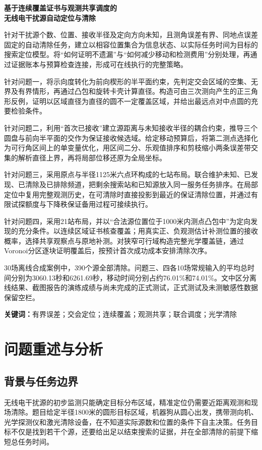 \documentclass[UTF8,a4paper,12pt,fontset=fandol]{ctexart}
\newcommand{\nextpage}{\clearpage}
\begin{document}
\begin{center}
{\heiti\bfseries 基于连续覆盖证书与观测共享调度的\\无线电干扰源自动定位与清除}\par
\vspace{12pt}{\large\heiti\bfseries 摘\quad 要}
\end{center}
针对干扰源个数、位置、接收半径及定向方向未知，且测角误差有界、同地点误差固定的自动清除任务，建立以相容位置集合为信息状态、以实际任务时间为目标的搜索定位模型。将“如何证明不遗漏”与“如何减少移动和检测费用”分别处理，再通过证据账本与预算检查连接，形成可在线执行的完整策略。

针对问题一，将示向度转化为前向楔形的半平面约束，先判定交会区域的空集、无界及有界情形，再通过凸包和旋转卡壳计算直径。构造可由三次测向产生的正三角形反例，证明以区域直径为直径的圆不一定覆盖区域，并给出最远点对中点圆的充要检验条件。

针对问题二，利用“首次已接收”建立源距离与未知接收半径的耦合约束，推导三个圆盘与前向半平面的交作为保证接收候选域。给定移动预算后，将第二测点选择化为可行角区间上的单变量优化，用区间二分、乐观值排序和剪枝缩小两条误差带交集的解析直径上界，再将局部位移还原为全局坐标。

针对问题三，采用原点与半径1125米六点环构成的七站布局。联合维护未知、已发现、已清除及已排除频道，把剩余搜索站和已知源放入同一服务任务排序。在局部定位中复用完整观测历史，在可清除时直接投影到最近的保证清除位置，并通过有限试探额度与下降秩保证备用过程可接续执行。

针对问题四，采用21站布局，并以“合法源位置位于1000米内测点凸包中”为定向发现的充分条件。以连续区域证书核查覆盖；用真实正、负观测估计补测位置的接收概率，选择共享观察点与原地补测。对狭窄可行域构造完整光学覆盖链，通过Voronoi分区逐块证明覆盖后，按预计首次成功成本安排清除次序。

30场离线合成案例中，390个源全部清除。问题三、四各10场常规输入的平均总时间分别为3060.13秒和6261.69秒，移动时间分别占约76.01\%和74.01\%。文中区分离线结果、截图报告的演练成绩与尚未完成的正式测试，正式测试及未测敏感性数据保留空栏。

\vspace{6pt}\noindent\textbf{关键词：}有界误差；交会定位；连续覆盖；观测共享；联合调度；光学清除

\nextpage
\section{问题重述与分析}
\subsection{背景与任务边界}
无线电干扰源的初步监测只能确定目标分布区域，精准定位仍需要近距离观测和现场清除。题目给定半径1800米的圆形目标区域，机器狗从圆心出发，携带测向机、光学探测仪和激光清除设备，在不知道实际源数和位置的条件下自主决策\cite{problem}。任务目标不仅是找到若干个源，还要给出足以结束搜索的证据，并在全部清除的前提下缩短总任务时间。
\end{document}
